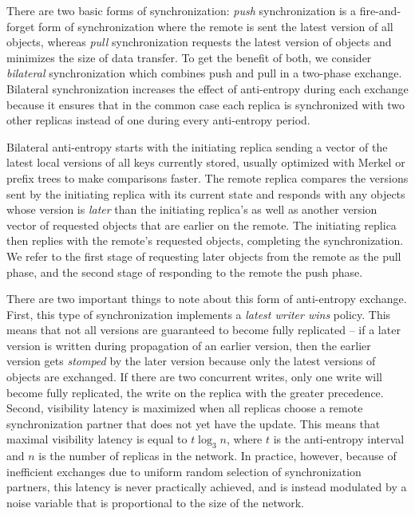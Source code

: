 There are two basic forms of synchronization: \textit{push} synchronization
is a fire-and-forget form of synchronization where the remote is sent the
latest version of all objects, whereas \textit{pull} synchronization requests
the latest version of objects and minimizes the size of data transfer.
To get the benefit of both, we consider \textit{bilateral} synchronization
which combines push and pull in a two-phase exchange.
Bilateral synchronization increases the effect of anti-entropy during each
exchange because it ensures that in the common case each replica is
synchronized with two other replicas instead of one during every anti-entropy
period.

Bilateral anti-entropy starts with the initiating replica sending a vector of
the latest local versions of all keys currently stored, usually optimized
with Merkel or prefix trees to make comparisons faster.
The remote replica compares the versions sent by the initiating replica with
its current state and responds with any objects whose version is
\textit{later} than the initiating replica's as well as another version
vector of requested objects that are earlier on the remote.
The initiating replica then replies with the remote's requested objects,
completing the synchronization.
We refer to the first stage of requesting later objects from the remote as
the pull phase, and the second stage of responding to the remote the push
phase.

There are two important things to note about this form of anti-entropy
exchange.
First, this type of synchronization implements a \textit{latest writer wins}
policy.
This means that not all versions are guaranteed to become fully replicated
-- if a later version is written during propagation of an earlier version,
then the earlier version gets \emph{stomped} by the later version because
only the latest versions of objects are exchanged.
If there are two concurrent writes, only one write will become fully
replicated, the write on the replica with the greater precedence.
Second, visibility latency is maximized when all replicas choose a remote
synchronization partner that does not yet have the update.
This means that maximal visibility latency is equal to $t\log_3n$, where
$t$ is the anti-entropy interval and $n$ is the number of replicas in the
network.
In practice, however, because of inefficient exchanges due to uniform random
selection of synchronization partners, this latency is never practically
achieved, and is instead modulated by a noise variable that is
proportional to the size of the network.

